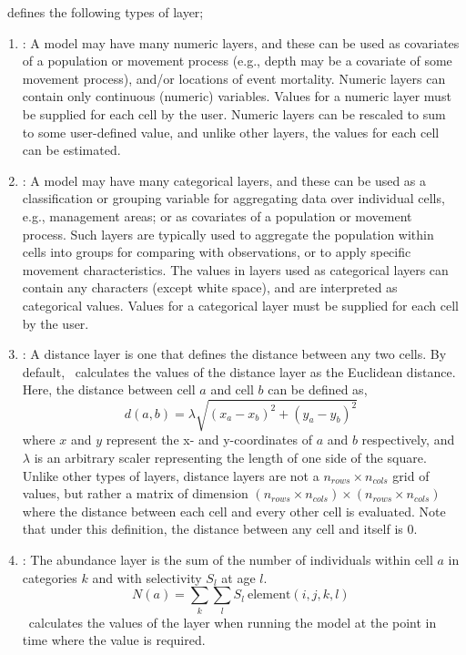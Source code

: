 \SPM\ defines the following types of layer;

\begin{enumerate}
\item{\label{numeric-layer}}: A model may have many numeric layers, and these can be used as covariates of a population or movement process (e.g., depth may be a covariate of some movement process), and/or locations of event mortality. Numeric layers can contain only continuous (numeric) variables. Values for a numeric layer must be supplied for each cell by the user. Numeric layers can be rescaled to sum to some user-defined value, and unlike other layers, the values for each cell can be estimated. 

\item {\label{categorical-layer}}: A model may have many categorical layers, and these can be used as a classification or grouping variable for aggregating data over individual cells, e.g., management areas; or as covariates of a population or movement process. Such layers are typically used to aggregate the population within cells into groups for comparing with observations, or to apply specific movement characteristics. The values in layers used as categorical layers can contain any characters (except white space), and are interpreted as categorical values. Values for a categorical layer must be supplied for each cell by the user.

\item {}: A distance layer is one that defines the distance between any two cells. By default, \SPM\ calculates the values of the distance layer as the Euclidean distance. Here, the distance between cell $a$ and cell $b$ can be defined as,
\begin{equation}
  d(a,b) = \lambda \sqrt{(x_a - x_b)^2 + (y_a - y_b)^2}
\end{equation}
where $x$ and $y$ represent the x- and y-coordinates of $a$ and $b$ respectively, and $\lambda$ is an arbitrary scaler representing the length of one side of the square. Unlike other types of layers, distance layers are not a $n_{rows} \times n_{cols}$ grid of values, but rather a matrix of dimension $(n_{rows} \times n_{cols}) \times (n_{rows} \times n_{cols})$  where the distance between each cell and every other cell is evaluated. Note that under this definition, the distance between any cell and itself is 0. 

\item{}: The abundance layer is the sum of the number of individuals within cell $a$ in categories $k$ and with selectivity $S_l$ at age $l$. 
\begin{equation}
  N(a) = \sum\limits_{k} \sum\limits_l S_l \ \text{element}(i,j,k,l)
\end{equation}
\SPM\ calculates the values of the layer when running the model at the point in time where the value is required.


\end{enumerate}
